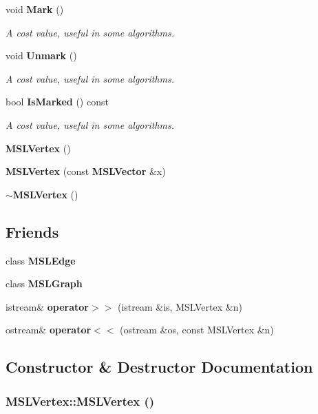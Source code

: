 \begin{CompactItemize}
$$void {\bf Mark} ()
\begin{CompactList}\small\item\em A cost value, useful in some algorithms.\item\end{CompactList}\item 
void {\bf Unmark} ()
\begin{CompactList}\small\item\em A cost value, useful in some algorithms.\item\end{CompactList}\item 
bool {\bf Is\-Marked} () const
\begin{CompactList}\small\item\em A cost value, useful in some algorithms.\item\end{CompactList}\item 
{\bf MSLVertex} ()
\item 
{\bf MSLVertex} (const {\bf MSLVector} \&x)
\item 
{\bf $\sim$MSLVertex} ()
\end{CompactItemize}
\subsection*{Friends}
\begin{CompactItemize}
\item 
class {\bf MSLEdge}
\item 
class {\bf MSLGraph}
\item 
istream\& {\bf operator$>$$>$} (istream \&is, MSLVertex \&n)
\item 
ostream\& {\bf operator$<$$<$} (ostream \&os, const MSLVertex \&n)
\end{CompactItemize}


\subsection{Constructor \& Destructor Documentation}
\subsubsection{\setlength{\rightskip}{0pt plus 5cm}MSLVertex::MSLVertex ()}\label{classMSLVertex_a9}


